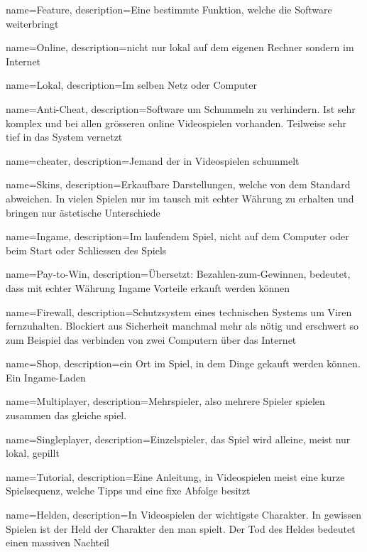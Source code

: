 {
  name={Feature},
  description={Eine bestimmte Funktion, welche die Software weiterbringt}
}

{
  name={Online},
  description={nicht nur lokal auf dem eigenen Rechner sondern im Internet}
}

{
  name={Lokal},
  description={Im selben Netz oder Computer}
}

{
  name={Anti-Cheat},
  description={Software um Schummeln zu verhindern.
  Ist sehr komplex und bei allen grösseren online Videospielen vorhanden.
  Teilweise sehr tief in das System vernetzt}
}

{
  name={cheater},
  description={Jemand der in Videospielen schummelt}
}

{
  name={Skins},
  description={Erkaufbare Darstellungen, welche von dem Standard abweichen.
  In vielen Spielen nur im tausch mit echter Währung zu erhalten und bringen nur ästetische Unterschiede}
}

{
  name={Ingame},
  description={Im laufendem Spiel, nicht auf dem Computer oder beim Start oder Schliessen des Spiels}
}

{
  name={Pay-to-Win},
  description={Übersetzt: Bezahlen-zum-Gewinnen, bedeutet, dass mit echter Währung Ingame Vorteile erkauft werden können}
}

{
  name={Firewall},
  description={Schutzsystem eines technischen Systems um Viren fernzuhalten.
  Blockiert aus Sicherheit manchmal mehr als nötig und erschwert so zum Beispiel das verbinden von zwei Computern über das Internet}
}

{
  name={Shop},
  description={ein Ort im Spiel, in dem Dinge gekauft werden können. Ein Ingame-Laden}
}


{
  name={Multiplayer},
  description={Mehrspieler, also mehrere Spieler spielen zusammen das gleiche spiel.}
}

{
  name={Singleplayer},
  description={Einzelspieler, das Spiel wird alleine, meist nur lokal, gepillt}
}

{
  name={Tutorial},
  description={Eine Anleitung, in Videospielen meist eine kurze Spielsequenz, welche Tipps und eine fixe Abfolge besitzt}
}

{
  name={Helden},
  description={In Videospielen der wichtigste Charakter.
  In gewissen Spielen ist der Held der Charakter den man spielt.
  Der Tod des Heldes bedeutet einen massiven Nachteil}
}

